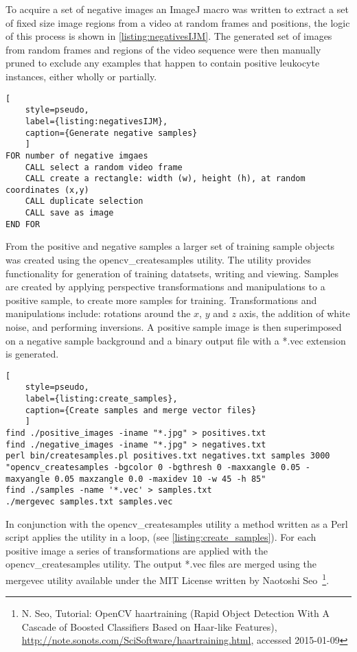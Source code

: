 To acquire a set of negative images an ImageJ macro was written to extract a set of fixed size image regions from a video at random frames and positions, the logic of this process is shown in \autoref{listing:negativesIJM}. The generated set of images from random frames and regions of the video sequence were then manually pruned to exclude any examples that happen to contain positive leukocyte instances, either wholly or partially.
\begin{lstlisting}[
	style=pseudo,
	label={listing:negativesIJM},
	caption={Generate negative samples}
	]
FOR number of negative imgaes
	CALL select a random video frame
	CALL create a rectangle: width (w), height (h), at random coordinates (x,y)
	CALL duplicate selection
	CALL save as image
END FOR
\end{lstlisting}

From the positive and negative samples a larger set of training sample objects was created using the opencv\_createsamples utility. The utility provides functionality for generation of training datatsets, writing and viewing. Samples are created by applying perspective transformations and manipulations to a positive sample, to create more samples for training. Transformations and  manipulations include: rotations around the $x$, $y$ and $z$ axis, the addition of white noise, and performing inversions. A positive sample image is then superimposed on a negative sample background and a binary output file with a *.vec extension is generated.

\begin{lstlisting}[
	style=pseudo,
	label={listing:create_samples},
	caption={Create samples and merge vector files}
	]
find ./positive_images -iname "*.jpg" > positives.txt
find ./negative_images -iname "*.jpg" > negatives.txt
perl bin/createsamples.pl positives.txt negatives.txt samples 3000 "opencv_createsamples -bgcolor 0 -bgthresh 0 -maxxangle 0.05 -maxyangle 0.05 maxzangle 0.0 -maxidev 10 -w 45 -h 85"
find ./samples -name '*.vec' > samples.txt
./mergevec samples.txt samples.vec
\end{lstlisting}

In conjunction with the opencv\_createsamples utility a method written as a Perl script applies the utility in a loop, (see \autoref{listing:create_samples}). For each positive image a series of transformations are applied with the opencv\_createsamples utility. The output *.vec files are merged using the mergevec utility available under the MIT License written by Naotoshi Seo~\footnote{N. Seo, Tutorial: OpenCV haartraining (Rapid Object Detection With A Cascade of Boosted Classifiers Based on Haar-like Features), \url{http://note.sonots.com/SciSoftware/haartraining.html}, accessed 2015-01-09}.

